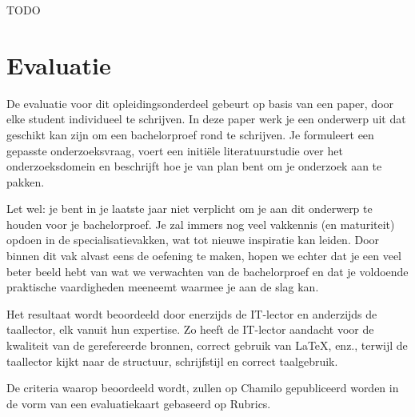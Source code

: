 TODO

\section{Evaluatie}
\label{sec:evaluatie}

De evaluatie voor dit opleidingsonderdeel gebeurt op basis van een paper, door elke student individueel te schrijven. In deze paper werk je een onderwerp uit dat geschikt kan zijn om een bachelorproef rond te schrijven. Je formuleert een gepasste onderzoeksvraag, voert een initiële literatuurstudie over het onderzoeksdomein en beschrijft hoe je van plan bent om je onderzoek aan te pakken. 

Let wel: je bent in je laatste jaar niet verplicht om je aan dit onderwerp te houden voor je bachelorproef. Je zal immers nog veel vakkennis (en maturiteit) opdoen in de specialisatievakken, wat tot nieuwe inspiratie kan leiden. Door binnen dit vak alvast eens de oefening te maken, hopen we echter dat je een veel beter beeld hebt van wat we verwachten van de bachelorproef en dat je voldoende praktische vaardigheden meeneemt waarmee je aan de slag kan.

Het resultaat wordt beoordeeld door enerzijds de IT-lector en anderzijds de taallector, elk vanuit hun expertise. Zo heeft de IT-lector aandacht voor de kwaliteit van de gerefereerde bronnen, correct gebruik van {\LaTeX}, enz., terwijl de taallector kijkt naar de structuur, schrijfstijl en correct taalgebruik.

De criteria waarop beoordeeld wordt, zullen op Chamilo gepubliceerd worden in de vorm van een evaluatiekaart gebaseerd op Rubrics.

